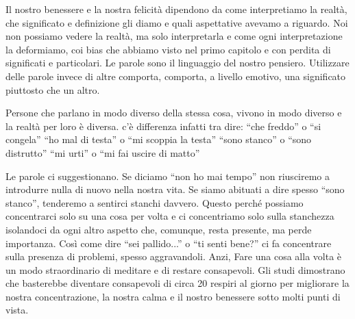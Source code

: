 \documentclass[12pt]{book} %
\begin{document}
Il nostro benessere e la nostra felicità dipendono da come interpretiamo la realtà, che significato e definizione gli
diamo e quali aspettative avevamo a riguardo. Noi non possiamo vedere la realtà, ma solo interpretarla e come ogni
interpretazione la deformiamo, coi bias che abbiamo visto nel primo capitolo e con perdita di significati e
particolari. Le parole sono il linguaggio del nostro pensiero. Utilizzare delle parole invece di altre comporta,
comporta, a livello emotivo, una significato piuttosto che un altro.

Persone che parlano in modo diverso della stessa cosa, vivono in modo diverso e la realtà per loro è diversa. c'è
differenza infatti tra dire:\newline
“che freddo” o “si congela”\newline
“ho mal di testa” o “mi scoppia la testa”\newline
“sono stanco” o “sono distrutto”\newline
“mi urti” o “mi fai uscire di matto”

Le parole ci suggestionano. Se diciamo “non ho mai tempo” non riusciremo a introdurre nulla di nuovo nella nostra vita.
Se siamo abituati a dire spesso “sono stanco”, tenderemo a sentirci stanchi davvero. Questo perché possiamo
concentrarci solo su una cosa per volta e ci concentriamo solo sulla stanchezza isolandoci da ogni altro aspetto che,
comunque, resta presente, ma perde importanza. Così come dire “sei pallido...” o “ti senti bene?” ci fa concentrare
sulla presenza di problemi, spesso aggravandoli. Anzi, Fare una cosa alla volta è un modo straordinario di meditare e
di restare consapevoli. Gli studi dimostrano che basterebbe diventare {\textquotedbl}consapevoli{\textquotedbl} di
circa 20 respiri al giorno per migliorare la nostra concentrazione, la nostra calma e il nostro benessere sotto molti
punti di vista.
\end{document}
